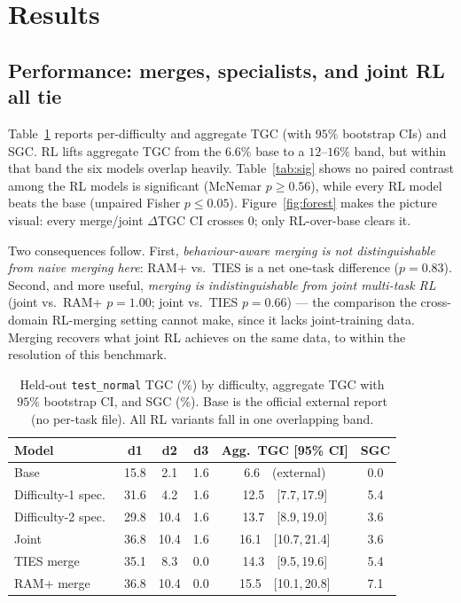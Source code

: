 \documentclass[11pt]{article}
\begin{document}
\section{Results}
\label{sec:results}

\subsection{Performance: merges, specialists, and joint RL all tie}
\label{sec:results-perf}
Table~\ref{tab:main} reports per-difficulty and aggregate TGC (with $95\%$ bootstrap CIs)
and SGC. RL lifts aggregate TGC from the $6.6\%$ base to a $12$--$16\%$ band, but within
that band the six models overlap heavily. Table~\ref{tab:sig} shows no paired contrast
among the RL models is significant (McNemar $p\ge0.56$), while every RL model beats the
base (unpaired Fisher $p\le0.05$). Figure~\ref{fig:forest} makes the picture visual: every
merge/joint $\Delta$TGC CI crosses $0$; only RL-over-base clears it.

Two consequences follow. First, \emph{behaviour-aware merging is not distinguishable from
naive merging here}: RAM+ vs.\ TIES is a net one-task difference ($p{=}0.83$). Second, and
more useful, \emph{merging is indistinguishable from joint multi-task RL}
(joint vs.\ RAM+ $p{=}1.00$; joint vs.\ TIES $p{=}0.66$) --- the comparison the
cross-domain RL-merging setting cannot make, since it lacks joint-training data. Merging
recovers what joint RL achieves on the same data, to within the resolution of this
benchmark.

\begin{table}[t]
\centering
\caption{Held-out \texttt{test\_normal} TGC (\%) by difficulty, aggregate TGC with $95\%$
bootstrap CI, and SGC (\%). Base is the official external report (no per-task file). All
RL variants fall in one overlapping band.}
\label{tab:main}
\small
\begin{tabular}{lccccc}
\toprule
Model & d1 & d2 & d3 & Agg.\ TGC [95\% CI] & SGC \\
\midrule
Base                 & 15.8 & 2.1  & 1.6 & 6.6\ \ (external) & 0.0 \\
Difficulty-1 spec.\  & 31.6 & 4.2  & 1.6 & 12.5\ \ [7.7,\,17.9] & 5.4 \\
Difficulty-2 spec.\  & 29.8 & 10.4 & 1.6 & 13.7\ \ [8.9,\,19.0] & 3.6 \\
Joint                & 36.8 & 10.4 & 1.6 & 16.1\ \ [10.7,\,21.4] & 3.6 \\
TIES merge           & 35.1 & 8.3  & 0.0 & 14.3\ \ [9.5,\,19.6] & 5.4 \\
RAM+ merge           & 36.8 & 10.4 & 0.0 & 15.5\ \ [10.1,\,20.8] & 7.1 \\
\bottomrule
\end{tabular}
\end{table}
\end{document}
